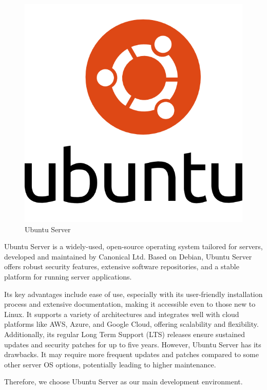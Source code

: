     \begin{figure}[H]
			\centering
			\includegraphics[scale=0.2]{graphics/ubuntu-server-logo.png}
			\caption{Ubuntu Server}
			\label{fig:ubuntuServer}
	\end{figure}
    
    Ubuntu Server is a widely-used, open-source operating system tailored for servers, developed and maintained by Canonical Ltd. Based on Debian, Ubuntu Server offers robust security features, extensive software repositories, and a stable platform for running server applications.
    
    \noindent Its key advantages include ease of use, especially with its user-friendly installation process and extensive documentation, making it accessible even to those new to Linux. It supports a variety of architectures and integrates well with cloud platforms like AWS, Azure, and Google Cloud, offering scalability and flexibility. Additionally, its regular Long Term Support (LTS) releases ensure sustained updates and security patches for up to five years. However, Ubuntu Server has its drawbacks. It may require more frequent updates and patches compared to some other server OS options, potentially leading to higher maintenance. \cite{ubuntu_server}

    Therefore, we choose Ubuntu Server as our main development environment.    
    
